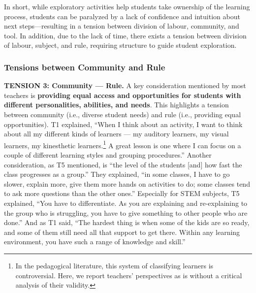 In short, while exploratory activities help students take ownership of the learning process, students can be paralyzed by a lack of confidence and intuition about next steps---resulting in a tension between division of labour, community, and tool.  In addition, due to the lack of time, there exists a tension between division of labour, subject, and rule, requiring structure to guide student exploration.

\subsubsection{Tensions between Community and Rule}
\label{sec:14}

\textbf{TENSION 3: Community --- Rule.} A key consideration mentioned by most teachers is \textbf{providing equal access and opportunities for students with different personalities, abilities, and needs}.  This highlights a tension between community (i.e., diverse student needs) and rule (i.e., providing equal opportunities). T1 explained, ``When I think about an activity, I want to think about all my different kinds of learners --- my auditory learners, my visual learners, my kinesthetic learners.\footnote{In the pedagogical literature, this system of classifying learners is controversial.  Here, we report teachers' perspectives as is without a critical analysis of their validity.} A great lesson is one where I can focus on a couple of different learning styles and grouping procedures.''  Another consideration, as T5 mentioned, is ``the level of the students [and] how fast the class progresses as a group.'' They explained, ``in some classes, I have to go slower, explain more, give them more hands on activities to do; some classes tend to ask more questions than the other ones.''  Especially for STEM subjects, T5 explained, ``You have to differentiate.  As you are explaining and re-explaining to the group who is struggling, you have to give something to other people who are done.''  And as T1 said, ``The hardest thing is when some of the kids are so ready, and some of them still need all that support to get there.  Within any learning environment, you have such a range of knowledge and skill.'' 

